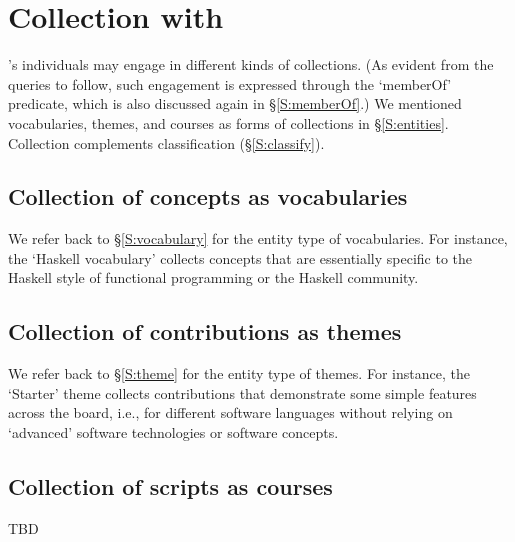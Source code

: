 
\section{Collection with \solasote}
\label{S:collect}

\solasote's individuals may engage in different kinds of collections. (As evident from the queries to follow, such engagement is expressed through the `memberOf' predicate, which is also discussed again in \S\ref{S:memberOf}.) We mentioned vocabularies, themes, and courses as forms of collections in \S\ref{S:entities}. Collection complements classification (\S\ref{S:classify}).


\subsection{Collection of concepts as vocabularies}

We refer back to \S\ref{S:vocabulary} for the entity type of vocabularies. For instance, the `Haskell vocabulary' collects concepts that are essentially specific to the Haskell style of functional programming or the Haskell community.




\subsection{Collection of contributions as themes}

We refer back to \S\ref{S:theme} for the entity type of themes. For instance, the `Starter' theme collects contributions that demonstrate some simple features across the board, i.e., for different software languages without relying on `advanced' software technologies or software concepts.




\subsection{Collection of scripts as courses}

TBD

